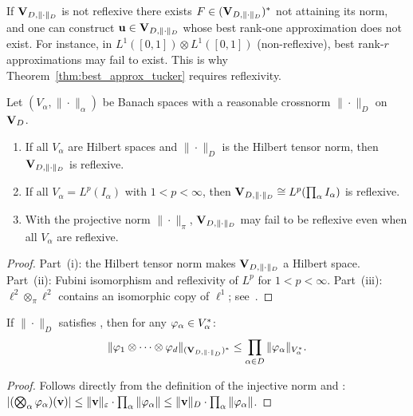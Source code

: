 \begin{remark}
\label{rem:james_tensor}
If $\mathbf{V}_{D,\|\cdot\|_D}$ is not reflexive there exists $F \in (\mathbf{V}_{D,\|\cdot\|_D})^*$ not
attaining its norm, and one can construct $\mathbf{u} \in \mathbf{V}_{D,\|\cdot\|_D}$ whose best
rank-one approximation does not exist. For instance, in
$L^1([0,1]) \otimes L^1([0,1])$ (non-reflexive), best rank-$r$
approximations may fail to exist. This is why
Theorem~\ref{thm:best_approx_tucker} requires reflexivity.
\end{remark}

\begin{proposition}
\label{prop:reflexivity_stability}
\label{prop:reflexivity_tensor}
Let $(V_\alpha, \|\cdot\|_\alpha)$ be Banach spaces with a reasonable
crossnorm $\|\cdot\|_D$ on $\mathbf{V}_D$.
\begin{enumerate}
\item[\textup{(i)}] If all $V_\alpha$ are Hilbert spaces and $\|\cdot\|_D$
    is the Hilbert tensor norm, then $\mathbf{V}_{D,\|\cdot\|_D}$ is reflexive.
\item[\textup{(ii)}] If all $V_\alpha = L^p(I_\alpha)$ with $1 < p < \infty$,
    then $\mathbf{V}_{D,\|\cdot\|_D} \cong L^p(\prod_\alpha I_\alpha)$ is reflexive.
\item[\textup{(iii)}] With the projective norm $\|\cdot\|_\pi$, $\mathbf{V}_{D,\|\cdot\|_D}$
    may fail to be reflexive even when all $V_\alpha$ are reflexive.
\end{enumerate}
\end{proposition}

\begin{proof}
Part~(i): the Hilbert tensor norm makes $\mathbf{V}_{D,\|\cdot\|_D}$ a Hilbert space.
Part~(ii): Fubini isomorphism and reflexivity of $L^p$ for $1<p<\infty$.
Part~(iii): $\ell^2 \otimes_\pi \ell^2$ contains an isomorphic copy of
$\ell^1$; see~\cite[Example~2.19]{Ryan2002}.
\end{proof}

\begin{proposition}
\label{prop:injnorm_dual}
If $\|\cdot\|_D$ satisfies \condINJ, then for any
$\varphi_\alpha \in V_\alpha^*$:
\begin{equation}
\label{eq:injnorm_dual_bound}
    \|\varphi_1 \otimes \cdots \otimes \varphi_d\|_{(\mathbf{V}_{D,\|\cdot\|_D})^*}
    \leq \prod_{\alpha \in D} \|\varphi_\alpha\|_{V_\alpha^*}.
\end{equation}
\end{proposition}

\begin{proof}
Follows directly from the definition of the injective norm and \condINJ:
$|(\bigotimes_\alpha \varphi_\alpha)(\mathbf{v})|
\leq \|\mathbf{v}\|_\varepsilon \cdot \prod_\alpha \|\varphi_\alpha\|
\leq \|\mathbf{v}\|_D \cdot \prod_\alpha \|\varphi_\alpha\|$.
\end{proof}

